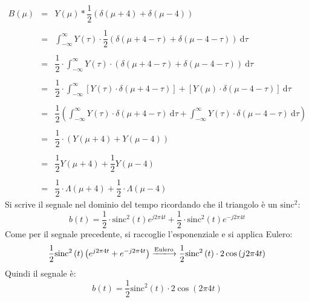 \documentclass[a4paper]{article}
\begin{document}
	\begin{equation*}
		\begin{array}{lll}
			B\left(\mu\right) & = & Y\left(\mu\right) * \dfrac{1}{2}\left(\delta\left(\mu+4\right) + \delta\left(\mu-4\right)\right) \\
			\\
			& = & \displaystyle\int_{-\infty}^{\infty} Y\left(\tau\right) \cdot \dfrac{1}{2}\left(\delta\left(\mu+4-\tau\right) + \delta\left(\mu-4-\tau\right)\right) \: \mathrm{d}\tau \\
			\\
			& = & \dfrac{1}{2} \cdot \displaystyle\int_{-\infty}^{\infty} Y\left(\tau\right) \cdot \left(\delta\left(\mu+4-\tau\right) + \delta\left(\mu-4-\tau\right)\right) \: \mathrm{d}\tau \\
			\\
			& = & \dfrac{1}{2} \cdot \displaystyle\int_{-\infty}^{\infty} \left[Y\left(\tau\right) \cdot \delta\left(\mu+4-\tau\right)\right] + \left[Y\left(\mu\right) \cdot \delta\left(\mu-4-\tau\right)\right] \: \mathrm{d}\tau \\
			\\
			& = & \dfrac{1}{2} \left( \displaystyle\int_{-\infty}^{\infty}Y\left(\tau\right) \cdot \delta\left(\mu+4-\tau\right) \: \mathrm{d}\tau + \displaystyle\int_{-\infty}^{\infty}Y\left(\tau\right) \cdot \delta\left(\mu-4-\tau\right) \: \mathrm{d}\tau \right) \\
			\\
			& = & \dfrac{1}{2} \cdot \left(Y\left(\mu+4\right) + Y\left(\mu-4\right)\right) \\
			\\
			& = & \dfrac{1}{2}Y\left(\mu+4\right) + \dfrac{1}{2}Y\left(\mu-4\right) \\
			\\
			& = & \dfrac{1}{2} \cdot \Lambda\left(\mu + 4\right) + \dfrac{1}{2} \cdot \Lambda\left(\mu - 4\right)
		\end{array}
	\end{equation*}
	Si scrive il segnale nel dominio del tempo ricordando che il triangolo è un $\mathrm{sinc}^{2}$:
	\begin{equation*}
		b\left(t\right) = \dfrac{1}{2} \cdot \mathrm{sinc}^{2}\left(t\right) e^{j 2 \pi 4 t} + \dfrac{1}{2} \cdot \mathrm{sinc}^{2}\left(t\right) e^{-j 2 \pi 4 t}
	\end{equation*}
	Come per il segnale precedente, si raccoglie l'esponenziale e si applica Eulero:
	\begin{equation*}
		\dfrac{1}{2} \mathrm{sinc}^{2}\left(t\right) \left(e^{j 2 \pi 4 t} + e^{-j 2 \pi 4 t}\right) \xlongrightarrow{\text{Eulero}} \dfrac{1}{2} \mathrm{sinc}^{2}\left(t\right) \cdot 2 \cos \left(j 2 \pi 4 t\right)
	\end{equation*}
	Quindi il segnale è:
	\begin{equation*}
		b\left(t\right) = \dfrac{1}{2} \mathrm{sinc}^{2}\left(t\right) \cdot 2\cos\left(2 \pi 4 t\right)
	\end{equation*}\newpage
\end{document}
